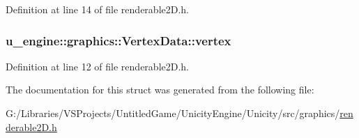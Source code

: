 Definition at line 14 of file renderable2\+D.\+h.

\hypertarget{structu__engine_1_1graphics_1_1_vertex_data_adf046d0ecf57011afb32f5ac737c2efd}{}
\subsubsection[{vertex}]{ u\+\_\+engine\+::graphics\+::\+Vertex\+Data\+::vertex}\label{structu__engine_1_1graphics_1_1_vertex_data_adf046d0ecf57011afb32f5ac737c2efd}


Definition at line 12 of file renderable2\+D.\+h.



The documentation for this struct was generated from the following file\+:\begin{DoxyCompactItemize}
\item 
G\+:/\+Libraries/\+V\+S\+Projects/\+Untitled\+Game/\+Unicity\+Engine/\+Unicity/src/graphics/\hyperlink{renderable2_d_8h}{renderable2\+D.\+h}\end{DoxyCompactItemize}
